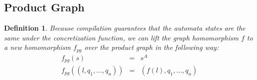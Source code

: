 \documentclass[twocolumn]{sig-alternate-10pt}
\newtheorem{defn}{Definition}
\begin{document}
\subsection{Product Graph}

\begin{defn}
  Because compilation guarantees that the automata states are the same under the concretization function, we can lift the graph homomorphism $f$ to a new homomorphism $f_{pg}$ over the product graph in the following way:
  \[ \begin{array}{rcl}
    f_{pg}( s ) & = & s^A  \\
    f_{pg}( (l,q_1,\ldots,q_n) ) & = & (f(l),q_1,\ldots,q_n) \\
  \end{array} \]
\end{defn}
\end{document}

